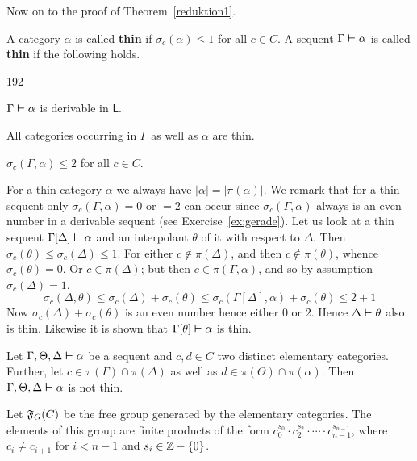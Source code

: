 Now on to the proof of Theorem~\ref{reduktion1}.
\begin{defn}
A category $\alpha$ is called \textbf{thin} if $\sigma_c(\alpha)
\leq 1$ for all $c \in C$. A sequent $\Gamma \boldsymbol{\vdash} \alpha$
is called \textbf{thin} if the following holds.
\begin{dingautolist}{192}
\item $\Gamma \boldsymbol{\vdash} \alpha$ is derivable in $\mathsf{L}$.
\item All categories occurring in $\Gamma$ as well as $\alpha$ are
thin.
\item $\sigma_c(\Gamma, \alpha) \leq 2$ for all $c \in C$.
\end{dingautolist}
\end{defn}
For a thin category $\alpha$ we always have $|\alpha| =
|\pi(\alpha)|$. We remark that for a thin sequent only
$\sigma_c(\Gamma, \alpha) = 0$ or $= 2$ can occur since
$\sigma_c(\Gamma, \alpha)$ always is an even number in
a derivable sequent (see Exercise~\ref{ex:gerade}). 
Let us look at a thin sequent
$\Gamma[\Delta] \boldsymbol{\vdash} \alpha$ and an interpolant $\theta$
of it with respect to $\Delta$. Then $\sigma_c(\theta) \leq %
\sigma_c(\Delta) \leq 1$. For either $c \not\in \pi(\Delta)$,
and then $c \not\in \pi(\theta)$, whence $\sigma_c(\theta) = 0$.
Or $c \in \pi(\Delta)$; but then $c \in \pi(\Gamma, \alpha)$,
and so by assumption $\sigma_c(\Delta) = 1$.
\begin{equation}
\sigma_c(\Delta, \theta) \leq
\sigma_c(\Delta) + \sigma_c(\theta) \leq \sigma_c(\Gamma[\Delta],
\alpha) + \sigma_c(\theta) \leq 2 + 1
\end{equation}
Now $\sigma_c(\Delta) + \sigma_c(\theta)$ is an even number
hence either $0$ or $2$. Hence $\Delta \boldsymbol{\vdash} \theta$
also is thin. Likewise it is shown that $\Gamma[\theta] \boldsymbol{\vdash} \alpha$
is thin.
\begin{lem}
\label{unduenn}
Let $\Gamma, \Theta, \Delta \boldsymbol{\vdash} \alpha$ be a sequent
and $c, d \in C$ two distinct elementary categories.
Further, let $c \in \pi(\Gamma) \cap \pi(\Delta)$ as well as
$d \in \pi(\Theta) \cap \pi(\alpha)$. Then $\Gamma, \Theta, \Delta \boldsymbol{\vdash}
\alpha$ is not thin.
\end{lem}
\proofbeg
Let $\mathfrak{F}_G(C)$ be the free group generated by the elementary categories.
The elements of this group are finite products of the form
$c_0^{s_0} \cdot c_2^{s_2} \cdot \dotsb \cdot c_{n-1}^{s_{n-1}}$,
where $c_i \neq c_{i+1}$ for $i < n-1$ and $s_i \in \mathbb{Z} - \{0\}$.
